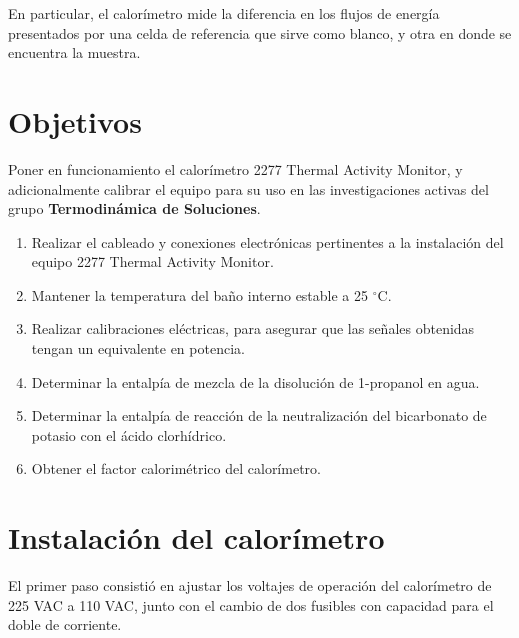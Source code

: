 \documentclass[a0]{sciposter}
\newcommand{\groupname}{\textbf{Termodinámica de Soluciones}}
\newcommand{\grad}{$^\circ$C}
\begin{document}
\begin{multicols}{3}
	En particular, el calorímetro mide la diferencia en los flujos de energía presentados por una celda de referencia que sirve como blanco, y otra en donde se encuentra la muestra.

\section{Objetivos}
	Poner en funcionamiento el calorímetro 2277 Thermal Activity Monitor, y adicionalmente calibrar el equipo para su uso en las investigaciones activas del grupo \groupname.
	\begin{enumerate}
		\item Realizar el cableado y conexiones electrónicas pertinentes a la instalaci\'on del equipo 2277 Thermal Activity Monitor.
		\item Mantener la temperatura del ba\~no interno estable a 25 \grad{}.
		\item Realizar calibraciones eléctricas, para asegurar que las señales obtenidas tengan un equivalente en potencia.
		\item Determinar la entalpía de mezcla de la disolución de 1-propanol en agua.
		\item Determinar la entalpía de reacción de la neutralización del bicarbonato de potasio con el \'acido clorhídrico.
		\item Obtener el factor calorimétrico del calorímetro.
	\end{enumerate}

\section{Instalaci\'on del calor\'imetro}
	El primer paso consistió en ajustar los voltajes de operación del calorímetro de 225 VAC a 110 VAC, junto con el cambio de dos fusibles con capacidad para el doble de corriente.
	

\end{multicols}
\end{document}
